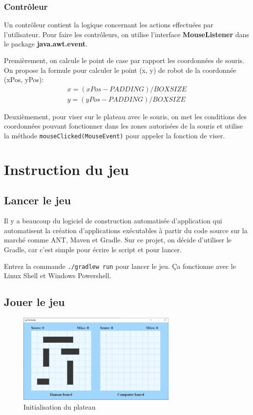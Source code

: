 \documentclass[12pt, pdflatex]{article}
\begin{document}
        \subsubsection{Contrôleur}
        Un contrôleur contient la logique concernant les actions effectuées par l'utilisateur. Pour faire les contrôleurs, on utilise l'interface \textbf{MouseListener} dans le package \textbf{java.awt.event}.

        Premièrement, on calcule le point de case par rapport les coordonnées de souris. On propose la formule pour calculer le point (x, y) de robot de la coordonnée (xPos, yPos):
        \begin{align*}
            x = (xPos - PADDING) / BOXSIZE \\ 
            y = (yPos - PADDING) / BOXSIZE
        \end{align*}

        Deuxièmement, pour viser sur le plateau avec le souris, on met les conditions des coordonnées pouvant fonctionner dans les zones autorisées de la souris et utilise la méthode \texttt{mouseClicked(MouseEvent)} pour appeler la fonction de viser.



\section{Instruction du jeu}
    \subsection{Lancer le jeu}
    Il y a beaucoup du logiciel de construction automatisée d’application qui automatisent la création d'applications exécutables à partir du code source sur la marché comme ANT, Maven et Gradle. Sur ce projet, on décide d'utiliser le Gradle, car c'est simple pour écrire le script et pour lancer.

    Entrez la commande \texttt{./gradlew run} pour lancer le jeu. Ça fonctionne avec le Linux Shell et Windows Powershell.

    \subsection{Jouer le jeu}
    
    \begin{figure}[H]
        \centering
        \includegraphics[width=0.7\textwidth]{sources/cap-1.png}
        \caption{Initialisation du plateau}
    \end{figure}
\end{document}
